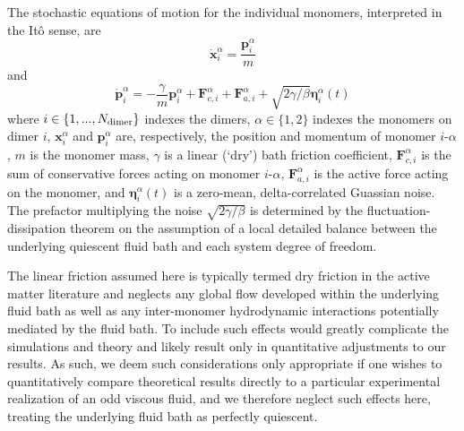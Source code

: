 \documentclass[%
 reprint,
superscriptaddress,
longbibliography,
 amsmath,amssymb,
 prl,
 citeautoscript,
]{revtex4-1}
\begin{document}
The stochastic equations of motion for the individual monomers, interpreted in the It\^{o} sense, are \cite{Cory_MD, my_PRL}
\begin{equation}
\dot{\boldsymbol x}_i^{\alpha} = \frac{{\boldsymbol p}_i^{\alpha}}{m}
\label{eqn:xeom_monomer}
\end{equation}
and
\begin{equation}
\dot{\boldsymbol p}_i^{\alpha} = - \frac{\gamma}{m} {\boldsymbol p}_i^{\alpha} + {\boldsymbol F}_{c,i}^{\alpha} + {\boldsymbol F}_{a,i}^{\alpha} + \sqrt{2 \gamma / \beta} {\boldsymbol \eta}_i^{\alpha} (t)
\label{eqn:peom_monomer}
\end{equation}
where $i \in \{1,...,N_{\rm dimer}\}$ indexes the dimers, $\alpha \in \{1,2\}$ indexes the monomers on dimer $i$, ${\boldsymbol x}_i^{\alpha}$ and ${\boldsymbol p}_i^{\alpha}$ are, respectively, the position and momentum of monomer $i$-$\alpha$, $m$ is the monomer mass, $\gamma$ is a linear (`dry') bath friction coefficient, ${\boldsymbol F}_{c,i}^{\alpha}$ is the sum of conservative forces acting on monomer $i$-$\alpha$, ${\boldsymbol F}_{a,i}^{\alpha}$ is the active force acting on the monomer, and ${\boldsymbol \eta}_i^{\alpha}(t)$ is a zero-mean, delta-correlated Guassian noise. The prefactor multiplying the noise $\sqrt{2\gamma/\beta}$ is determined by the fluctuation-dissipation theorem on the assumption of a local detailed balance between the underlying quiescent fluid bath and each system degree of freedom.

The linear friction assumed here is typically termed dry friction in the active matter literature \cite{joanny} and neglects any global flow developed within the underlying fluid bath \cite{Hosaka_mobility} as well as any inter-monomer hydrodynamic interactions potentially mediated by the fluid bath. To include such effects would greatly complicate the simulations and theory and likely result only in quantitative adjustments to our results. As such, we deem such considerations only appropriate if one wishes to quantitatively compare theoretical results directly to a particular experimental realization of an odd viscous fluid, and we therefore neglect such effects here, treating the underlying fluid bath as perfectly quiescent.
\end{document}
